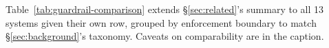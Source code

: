 
Table~\ref{tab:guardrail-comparison} extends \S\ref{sec:related}'s summary
to all 13 systems given their own row, grouped by enforcement boundary to
match \S\ref{sec:background}'s taxonomy. Caveats on comparability are in
the caption.


